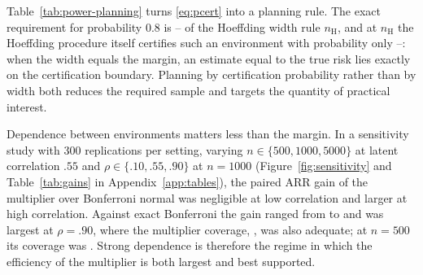 \documentclass[twoside,11pt]{article}
\begin{document}
\begin{table}[t]
\centering\small\setlength{\tabcolsep}{4pt}
\caption{Assurance-sample planning at $\tau=.10$ and $\alpha=.05$ for an environment whose risk
is $\Delta$ below the tolerance. $n_{\mathrm H}=\lceil\log(K/\alpha)/(2\Delta^2)\rceil$ is the
Hoeffding width rule. The exact columns give the smallest $n$ from which the exact-Bonferroni
certification probability \eqref{eq:pcert} stays at or above the stated level; the last two
columns give the certification probability of each procedure at $n_{\mathrm H}$.}
\label{tab:power-planning}
\end{table}

Table~\ref{tab:power-planning} turns \eqref{eq:pcert} into a planning rule. The exact
requirement for probability 0.8 is \PlanRatioMin--\PlanRatioMax{} of the Hoeffding width rule
$n_{\mathrm H}$, and at $n_{\mathrm H}$ the Hoeffding procedure itself certifies such an
environment with probability only \PlanHoeffProbMin--\PlanHoeffProbMax: when the width equals
the margin, an estimate equal to the true risk lies exactly on the certification boundary.
Planning by certification probability rather than by width both reduces the required sample
and targets the quantity of practical interest.

Dependence between environments matters less than the margin. In a sensitivity study with 300
replications per setting, varying $n\in\{500,1000,5000\}$ at latent correlation $.55$ and
$\rho\in\{.10,.55,.90\}$ at $n=1000$ (Figure~\ref{fig:sensitivity} and
Table~\ref{tab:gains} in Appendix~\ref{app:tables}), the paired ARR gain of the multiplier over
Bonferroni normal was negligible at low correlation and larger at high correlation. Against
exact Bonferroni the gain ranged from \GainExactMin{} to \GainExactMax{} and was largest at
$\rho=.90$, where the multiplier coverage, \SensMultCovHighRho, was also adequate; at $n=500$
its coverage was \SensMultCovSmallN. Strong dependence is therefore the regime in which the
efficiency of the multiplier is both largest and best supported.
\end{document}
